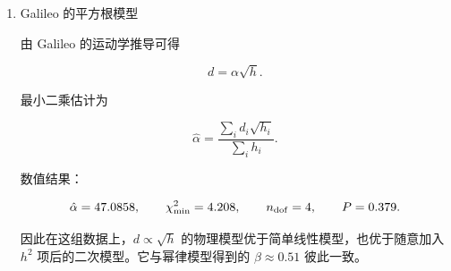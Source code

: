 \begin{question}
\begin{solution}
\begin{enumerate}
这已经是可以接受的拟合。

\item Galileo 的平方根模型

由 Galileo 的运动学推导可得

\[
d=\alpha\sqrt h.
\]

最小二乘估计为

\[
\hat\alpha=
\frac{\sum_i d_i\sqrt{h_i}}{\sum_i h_i}.
\]

数值结果：

\[
\hat\alpha=47.0858,
\qquad
\chi^2_{\min}=4.208,
\qquad
n_{\rm dof}=4,
\qquad
P=0.379.
\]

因此在这组数据上，\(d\propto\sqrt h\)
的物理模型优于简单线性模型，也优于随意加入 \(h^2\)
项后的二次模型。它与幂律模型得到的 \(\beta\approx0.51\) 彼此一致。
\end{enumerate}
\end{solution}
\end{question}


